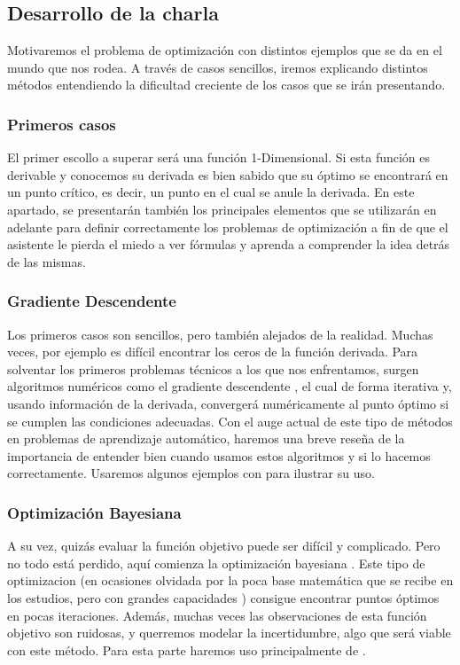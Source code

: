 \documentclass[runningheads]{llncs}
\begin{document}
\subsection{Desarrollo de la charla}
Motivaremos el problema de optimización con distintos ejemplos que se da en el mundo que nos rodea. A través de casos sencillos, iremos explicando distintos métodos entendiendo la dificultad creciente de los casos que se irán presentando. 

\subsubsection{Primeros casos}
El primer escollo a superar será una función 1-Dimensional. Si esta función es derivable y conocemos su derivada es bien sabido que su óptimo se encontrará en un punto crítico, es decir, un punto en el cual se anule la derivada. En este apartado, se presentarán también los principales elementos que se utilizarán en adelante \cite{bonnans2006numerical} para definir correctamente los problemas de optimización a fin de que el asistente le pierda el miedo a ver fórmulas y aprenda a comprender la idea detrás de las mismas.

\subsubsection{Gradiente Descendente}
Los primeros casos son sencillos, pero también alejados de la realidad. Muchas veces, por ejemplo es difícil encontrar los ceros de la función derivada. Para solventar los primeros problemas técnicos a los que nos enfrentamos, surgen algoritmos numéricos como el gradiente descendente \cite{ruder2016overview}, el cual de forma iterativa y, usando información de la derivada, convergerá numéricamente al punto óptimo si se cumplen las condiciones adecuadas. Con el auge actual de este tipo de métodos en problemas de aprendizaje automático, haremos una breve reseña de la importancia de entender bien cuando usamos estos algoritmos y si lo hacemos correctamente. Usaremos algunos ejemplos con \cite{scikit-learn} para ilustrar su uso.

\subsubsection{Optimización Bayesiana}
A su vez, quizás evaluar la función objetivo puede ser difícil y complicado. Pero no todo está perdido, aquí comienza la optimización bayesiana \cite{lizotte2008practical}. Este tipo de optimizacion (en ocasiones olvidada por la poca base matemática que se recibe en los estudios, pero con grandes capacidades \cite{snoek2012practical}) consigue encontrar puntos óptimos en pocas iteraciones. Además, muchas veces las observaciones de esta función objetivo son ruidosas, y querremos modelar la incertidumbre, algo que será viable con este método. Para esta parte haremos uso principalmente de \cite{gpyopt2016}.
\end{document}
